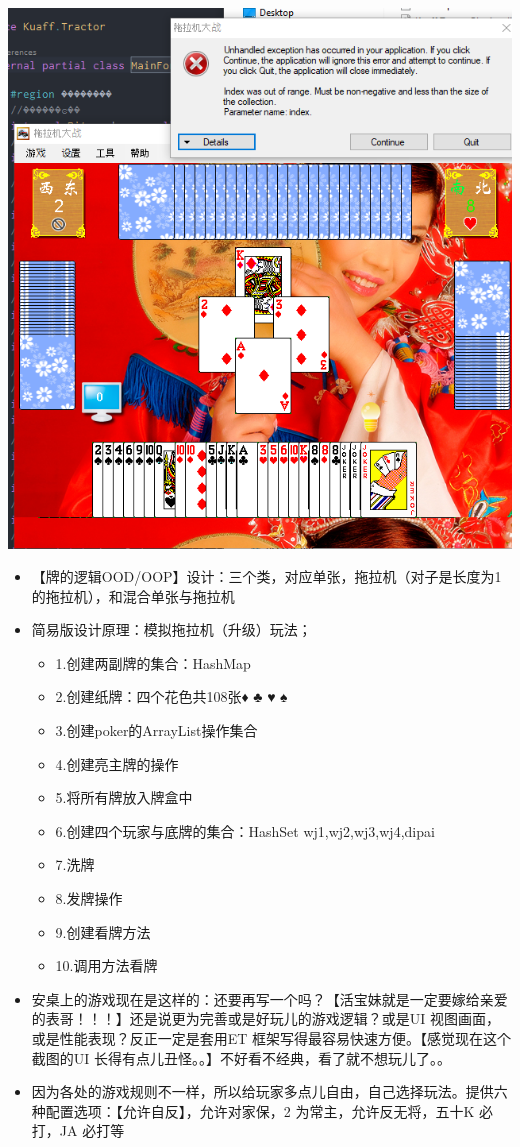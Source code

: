 \documentclass[9pt, b5paper]{article}
\begin{document}
\begin{center}
\includegraphics[width=.9\linewidth]{./pic/readme_20230510_043722.png}
\end{center}

\begin{itemize}
\item 【牌的逻辑OOD/OOP】设计：三个类，对应单张，拖拉机（对子是长度为1 的拖拉机），和混合单张与拖拉机
\item 简易版设计原理：模拟拖拉机（升级）玩法；
\begin{itemize}
\item 1.创建两副牌的集合：HashMap
\item 2.创建纸牌：四个花色共108张♦ ♣ ♥ ♠
\item 3.创建poker的ArrayList操作集合
\item 4.创建亮主牌的操作
\item 5.将所有牌放入牌盒中
\item 6.创建四个玩家与底牌的集合：HashSet wj1,wj2,wj3,wj4,dipai
\item 7.洗牌
\item 8.发牌操作
\item 9.创建看牌方法
\item 10.调用方法看牌
\end{itemize}
\item 安桌上的游戏现在是这样的：还要再写一个吗？【活宝妹就是一定要嫁给亲爱的表哥！！！】还是说更为完善或是好玩儿的游戏逻辑？或是UI 视图画面，或是性能表现？反正一定是套用ET 框架写得最容易快速方便。【感觉现在这个截图的UI 长得有点儿丑怪。。】不好看不经典，看了就不想玩儿了。。
\item 因为各处的游戏规则不一样，所以给玩家多点儿自由，自己选择玩法。提供六种配置选项：【允许自反】，允许对家保，2 为常主，允许反无将，五十K 必打，JA 必打等
\end{itemize}
\end{document}
